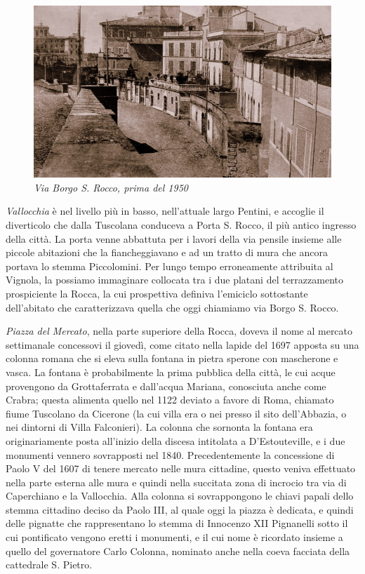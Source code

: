 \documentclass[
  letterpaper,
  DIV=11,
  numbers=noendperiod]{scrartcl}
\begin{document}
\begin{figure}[H]

{\centering \includegraphics{../../images/2024/san_rocco/9via-borgo-san-rocco.jpg}

}

\caption{\emph{Via Borgo S. Rocco, prima del 1950}}

\end{figure}%

\emph{Vallocchia} è nel livello più in basso, nell'attuale largo
Pentini, e accoglie il diverticolo che dalla Tuscolana conduceva a Porta
S. Rocco, il più antico ingresso della città. La porta venne abbattuta
per i lavori della via pensile insieme alle piccole abitazioni che la
fiancheggiavano e ad un tratto di mura che ancora portava lo stemma
Piccolomini. Per lungo tempo erroneamente attribuita al Vignola, la
possiamo immaginare collocata tra i due platani del terrazzamento
prospiciente la Rocca, la cui prospettiva definiva l'emiciclo
sottostante dell'abitato che caratterizzava quella che oggi chiamiamo
via Borgo S. Rocco.

\emph{Piazza del Mercato}, nella parte superiore della Rocca, doveva il
nome al mercato settimanale concessovi il giovedì, come citato nella
lapide del 1697 apposta su una colonna romana che si eleva sulla fontana
in pietra sperone con mascherone e vasca. La fontana è probabilmente la
prima pubblica della città, le cui acque provengono da Grottaferrata e
dall'acqua Mariana, conosciuta anche come Crabra; questa alimenta quello
nel 1122 deviato a favore di Roma, chiamato fiume Tuscolano da Cicerone
(la cui villa era o nei presso il sito dell'Abbazia, o nei dintorni di
Villa Falconieri). La colonna che sornonta la fontana era
originariamente posta all'inizio della discesa intitolata a
D'Estouteville, e i due monumenti vennero sovrapposti nel 1840.
Precedentemente la concessione di Paolo V del 1607 di tenere mercato
nelle mura cittadine, questo veniva effettuato nella parte esterna alle
mura e quindi nella succitata zona di incrocio tra via di Caperchiano e
la Vallocchia. Alla colonna si sovrappongono le chiavi papali dello
stemma cittadino deciso da Paolo III, al quale oggi la piazza è
dedicata, e quindi delle pignatte che rappresentano lo stemma di
Innocenzo XII Pignanelli sotto il cui pontificato vengono eretti i
monumenti, e il cui nome è ricordato insieme a quello del governatore
Carlo Colonna, nominato anche nella coeva facciata della cattedrale S.
Pietro.
\end{document}
